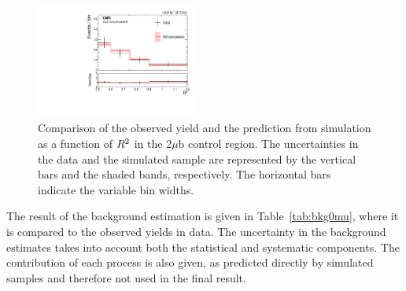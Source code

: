 \begin{figure}
  \centering
   \includegraphics[width=0.47\textwidth]{BtagPlots/MC_CP_2Mu1TbTT_Sep.pdf}
   \caption{Comparison of the observed yield and the prediction from
     simulation as a function of $R^2$ in the 2$\mu$b control region.
     The uncertainties in the data and the simulated
     sample are represented by the vertical bars and the shaded bands,
     respectively. The horizontal bars indicate
the variable bin widths.\label{fig:2mub}}
\end{figure}
The result of the background estimation is given in
Table~\ref{tab:bkg0mu}, where it is compared to the observed yields in
data. The uncertainty in the background estimates takes into account
both the statistical and systematic components. The contribution of each process is also given,
as predicted directly by simulated samples and therefore not used in
the final result.
\begin{table}
\centering
{}
\end{table}

